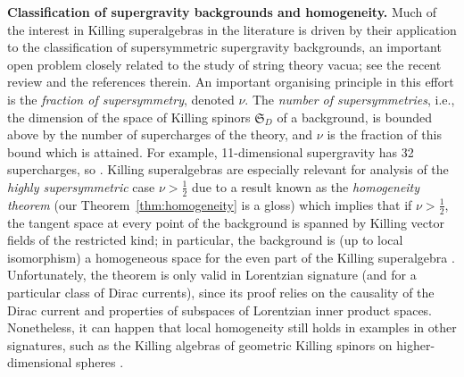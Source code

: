 \documentclass[10pt,a4paper]{amsart}
\numberwithin{equation}{section}
\newcommand{\fS}{\mathfrak{S}}
\newcommand{\1}{\mathbbm{1}}
\begin{document}
{\bf Classification of supergravity backgrounds and homogeneity.}
Much of the interest in Killing superalgebras in the literature is driven by their application to the classification of supersymmetric supergravity backgrounds, an important open problem closely related to the study of string theory vacua; see the recent review \cite{Gran2019} and the references therein. An important organising principle in this effort is the \emph{fraction of supersymmetry}, denoted $\nu$. The \emph{number of supersymmetries}, i.e., the dimension of the space of Killing spinors $\fS_D$ of a background, is bounded above by the number of supercharges of the theory, and $\nu$ is the fraction of this bound which is attained. For example, 11-dimensional supergravity has 32 supercharges, so \smash{$\nu=\frac{\dim\fS_D}{32}$}. Killing superalgebras are especially relevant for analysis of the \emph{highly supersymmetric} case $\nu>\frac{1}{2}$ due to a result known as the \emph{homogeneity theorem} (our Theorem~\ref{thm:homogeneity} is a gloss) which implies that if $\nu>\frac{1}{2}$, the tangent space at every point of the background is spanned by Killing vector fields of the restricted kind; in particular, the background is (up to local isomorphism) a homogeneous space for the even part of the Killing superalgebra \cite{Figueroa-OFarrill2012,Figueroa-OFarrill2014,Hustler2016}. Unfortunately, the theorem is only valid in Lorentzian signature (and for a particular class of Dirac currents), since its proof relies on the causality of the Dirac current and properties of subspaces of Lorentzian inner product spaces. Nonetheless, it can happen that local homogeneity still holds in examples in other signatures, such as the Killing algebras of geometric Killing spinors on higher-dimensional spheres \cite{Figueroa-OFarrill2008_except}.
\end{document}
